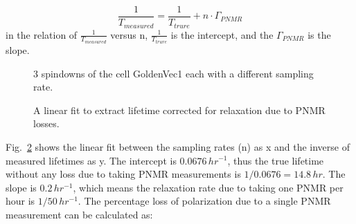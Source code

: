 \begin{equation}
\frac{1}{T_{measured}} = \frac{1}{T_{trure}} + n\cdot \Gamma_{PNMR}
\end{equation}
in the relation of $\frac{1}{T_{measured}}$ versus n, $\frac{1}{T_{trure}}$ is the intercept, and the $\Gamma_{PNMR}$ is the slope.

\begin{figure}[t!]
	\centering
	\caption{{3 spindowns of the cell GoldenVec1 each with a different sampling rate.}}
	\label{3spindowns}
\end{figure}

\begin{figure}[t!]
	\centering
	\caption{{A linear fit to extract lifetime corrected for relaxation due to PNMR losses.}}
	\label{corrected_T1}
\end{figure}

Fig.~\ref{corrected_T1} shows the linear fit between the sampling rates (n) as x and the inverse of measured lifetimes as y. The intercept is $0.0676\,hr^{-1}$, thus the true lifetime without any loss due to taking PNMR measurements is $1/0.0676=14.8\,hr$. The slope is $0.2\,hr^{-1}$, which means the relaxation rate due to taking one PNMR per hour is $1/50\,hr^{-1}$. The percentage loss of polarization due to a single PNMR measurement can be calculated as:

